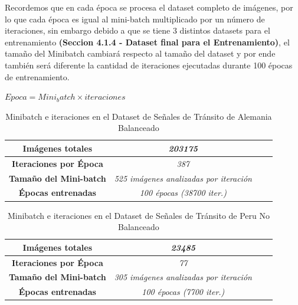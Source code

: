 		Recordemos que en cada época se procesa el dataset completo de imágenes, por lo que cada época es igual al mini-batch multiplicado por un número de iteraciones, sin embargo debido a que se tiene 3 distintos datasets para el entrenamiento \textbf{(Seccion 4.1.4 - Dataset final para el Entrenamiento)}, el tamaño del Minibatch cambiará respecto al tamaño del dataset y por ende también será diferente la cantidad de iteraciones ejecutadas durante 100 épocas de entrenamiento.                        
		
		\begingroup\makeatletter{}\check@mathfonts	$Epoca = Mini_batch \times iteraciones$ \endgroup

		\begin{table}[H]
			\begin{center}
			\caption{\small{Minibatch e iteraciones en el Dataset de Señales de Tránsito de Alemania Balanceado}}
			\begin{tabular}{|>{\scriptsize}c|>{\scriptsize}c|>{\scriptsize}c|>{\scriptsize}c|}
			\hline
			\textbf{Imágenes totales }                 &\textit{203175}                       \\ \hline
			\textbf{Iteraciones por Época}                 &\textit{387}                             \\ \hline
			\textbf{Tamaño del Mini-batch}                 &\textit{525 imágenes analizadas por iteración}                       \\ \hline
			\textbf{Épocas entrenadas}                &\textit{100 épocas (38700 iter.)}                       \\ \hline
			\end{tabular}
			\end{center}
		\end{table}


		\begin{table}[H]
			\begin{center}
			\caption{\small{Minibatch e iteraciones en el Dataset de Señales de Tránsito de Peru No Balanceado}}
			\begin{tabular}{|>{\scriptsize}c|>{\scriptsize}c|>{\scriptsize}c|>{\scriptsize}c|}
			\hline
			\textbf{Imágenes totales }                 &\textit{23485}                       \\ \hline
			\textbf{Iteraciones por Época}                 &\textit{77}                             \\ \hline
			\textbf{Tamaño del Mini-batch}                 &\textit{305 imágenes analizadas por iteración}                       \\ \hline
			\textbf{Épocas entrenadas}                &\textit{100 épocas (7700 iter.)}                       \\ \hline
			\end{tabular}
			\end{center}
		\end{table}

